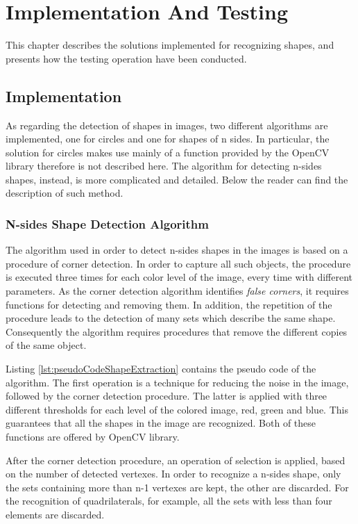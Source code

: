 \chapter{Implementation And Testing}\label{impl_test}
	This chapter describes the solutions implemented for recognizing shapes, and presents how the testing operation have been conducted.
	
	
	\section{Implementation}
		As regarding the detection of shapes in images, two different algorithms are implemented, one for circles and one for shapes of n sides.
		In particular, the solution for circles makes use mainly of a function provided by the \mbox{OpenCV} library therefore is not described here.
		The algorithm for detecting n-sides shapes, instead, is more complicated and detailed. 
		Below the reader can find the description of such method.
	
		\subsection{N-sides Shape Detection Algorithm}
		The algorithm used in order to detect n-sides shapes in the images is based on a procedure of corner detection. 
		In order to capture all such objects, the procedure is executed three times for each color level of the image, every time with different parameters.
		As the corner detection algorithm identifies \emph{false corners}, it requires functions for detecting and removing them. 
		In addition, the repetition of the procedure leads to the detection of many sets which describe the same shape.	
		Consequently the algorithm requires procedures that remove the different copies of the same object.


		
		Listing \ref{lst:pseudoCodeShapeExtraction} contains the pseudo code of the algorithm.
		The first operation is a technique for reducing the noise in the image, followed by the corner detection procedure.
		The latter is applied with three different thresholds for each level of the colored image, red, green and blue.
		This guarantees that all the shapes in the image are recognized.
		Both of these functions are offered by \mbox{OpenCV} library.

		
		After the corner detection procedure, an operation of selection is applied, based on the number of detected vertexes.
		In order to recognize a n-sides shape, only the sets containing more than n-1 vertexes are kept, the other are discarded.
		For the recognition of quadrilaterals, for example, all the sets with less than four elements are discarded.
		



